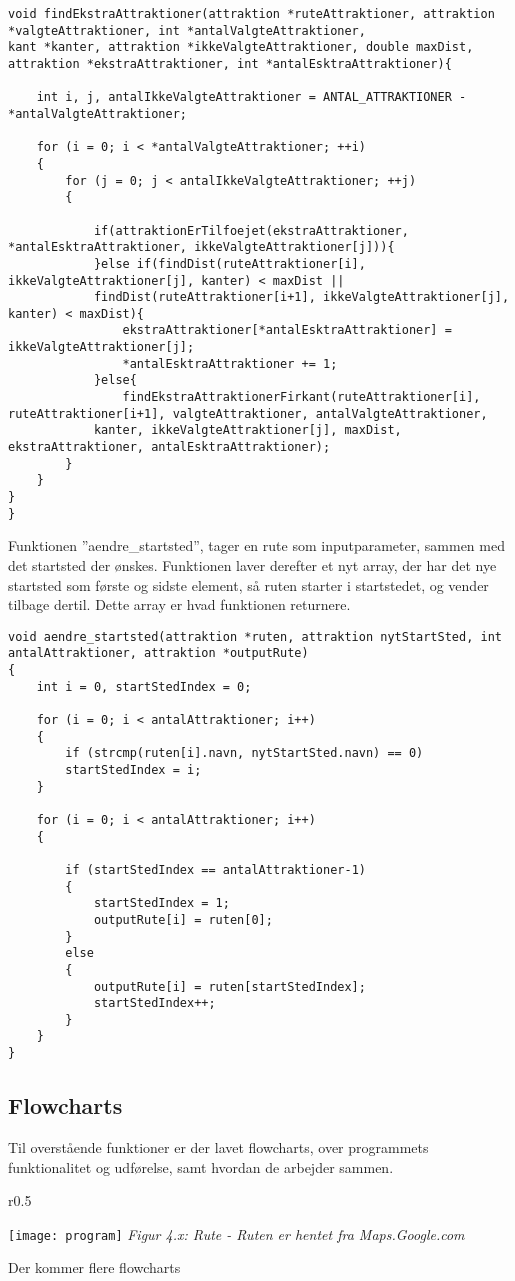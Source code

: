 \begin{lstlisting}
void findEkstraAttraktioner(attraktion *ruteAttraktioner, attraktion *valgteAttraktioner, int *antalValgteAttraktioner, 
kant *kanter, attraktion *ikkeValgteAttraktioner, double maxDist, attraktion *ekstraAttraktioner, int *antalEsktraAttraktioner){
	
	int i, j, antalIkkeValgteAttraktioner = ANTAL_ATTRAKTIONER - *antalValgteAttraktioner;
	
	for (i = 0; i < *antalValgteAttraktioner; ++i)
	{
		for (j = 0; j < antalIkkeValgteAttraktioner; ++j)
		{
			
			if(attraktionErTilfoejet(ekstraAttraktioner, *antalEsktraAttraktioner, ikkeValgteAttraktioner[j])){
			}else if(findDist(ruteAttraktioner[i], ikkeValgteAttraktioner[j], kanter) < maxDist || 
			findDist(ruteAttraktioner[i+1], ikkeValgteAttraktioner[j], kanter) < maxDist){
				ekstraAttraktioner[*antalEsktraAttraktioner] = ikkeValgteAttraktioner[j];
				*antalEsktraAttraktioner += 1;
			}else{
				findEkstraAttraktionerFirkant(ruteAttraktioner[i], ruteAttraktioner[i+1], valgteAttraktioner, antalValgteAttraktioner,
			kanter, ikkeValgteAttraktioner[j], maxDist, ekstraAttraktioner, antalEsktraAttraktioner);
		}
	}
}
}
\end{lstlisting}

Funktionen ”aendre\_startsted”, tager en rute som inputparameter, sammen med det startsted der ønskes. Funktionen laver derefter et nyt array, der har det nye startsted som første og sidste element, så ruten starter i startstedet, og vender tilbage dertil. Dette array er hvad funktionen returnere.  \newline

\begin{lstlisting}
void aendre_startsted(attraktion *ruten, attraktion nytStartSted, int antalAttraktioner, attraktion *outputRute)
{
	int i = 0, startStedIndex = 0;
	
	for (i = 0; i < antalAttraktioner; i++)
	{
		if (strcmp(ruten[i].navn, nytStartSted.navn) == 0)
		startStedIndex = i;
	}
	
	for (i = 0; i < antalAttraktioner; i++)
	{
		
		if (startStedIndex == antalAttraktioner-1)
		{
			startStedIndex = 1;
			outputRute[i] = ruten[0];
		}
		else
		{
			outputRute[i] = ruten[startStedIndex];
			startStedIndex++;
		}
	}
}
\end{lstlisting}

\subsection{Flowcharts}
Til overstående funktioner er der lavet flowcharts, over programmets funktionalitet og udførelse, samt hvordan de arbejder sammen.\newline

\begin{wrapfigure}{r}{0.5\textwidth}
  \vspace{-40pt}
  \begin{center}
    \texttt{[image: program]}\newline
    \textit{Figur 4.x: Rute - Ruten er hentet fra Maps.Google.com}
  \end{center}
  \vspace{0pt}
  \vspace{0pt}
\end{wrapfigure}

Der kommer flere flowcharts